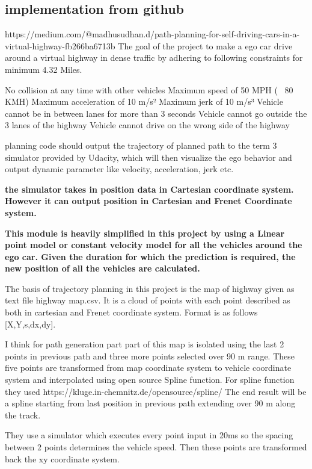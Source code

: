 \documentclass{article}
\begin{document}
  \subsection{implementation from github}
  https://medium.com/@madhusudhan.d/path-planning-for-self-driving-cars-in-a-virtual-highway-fb266ba6713b
  The goal of the project to make a ego car drive around a virtual highway in dense traffic by adhering to following constraints for minimum 4.32 Miles.

    No collision at any time with other vehicles
    Maximum speed of 50 MPH (~ 80 KMH)
    Maximum acceleration of 10 m/s²
    Maximum jerk of 10 m/s³
    Vehicle cannot be in between lanes for more than 3 seconds
    Vehicle cannot go outside the 3 lanes of the highway
    Vehicle cannot drive on the wrong side of the highway
    
    planning code should output the trajectory of planned path to the term 3 simulator provided by Udacity, which will then visualize the ego behavior and output dynamic parameter like velocity, acceleration, jerk etc.
  
  \textbf{the simulator takes in position data in Cartesian coordinate system. However it can output position in Cartesian and Frenet Coordinate system. }
  
  \textbf{This module is heavily simplified in this project by using a Linear point model or constant velocity model for all the vehicles around the ego car. Given the duration for which the prediction is required, the new position of all the vehicles are calculated. }
  
  The basis of trajectory planning in this project is the map of highway given as text file highway map.csv. It is a cloud of points with each point described as both in cartesian and Frenet coordinate system. Format is as follows [X,Y,s,dx,dy].
  
  I think for path generation part  part of this map is isolated using the last 2 points in previous path and three more points selected over 90 m range. These five points are transformed from map coordinate system to vehicle coordinate system and interpolated using open source Spline function. For spline function they used https://kluge.in-chemnitz.de/opensource/spline/ The end result will be a spline starting from last position in previous path extending over 90 m along the track.
  
  They use a simulator which executes every point input in 20ms so the spacing between 2 points determines the vehicle speed. Then these points are transformed back the xy coordinate system. 
  
\end{document}
